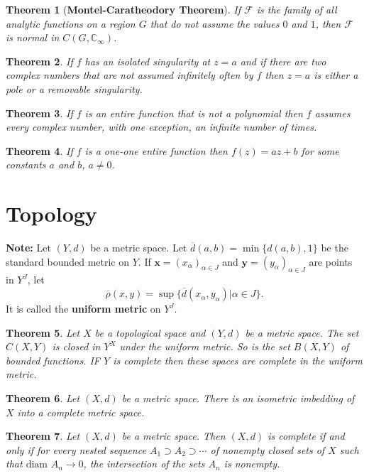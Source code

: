 \documentclass[answers, a4paper, 12pt]{exam}
\newtheorem{theorem}{Theorem}[section]
\newcommand{\C}{\mathbb{C}}
\begin{document}
\begin{theorem}[\textbf{Montel-Caratheodory Theorem}]
    If $\mathcal{F}$ is the family of all analytic functions on a region $G$ that do not assume the values $0$ and $1$, then $\mathcal{F}$ is normal in $C(G,\C_{\infty})$.
\end{theorem}

\begin{theorem}
    If $f$ has an isolated singularity at $z=a$ and if there are two complex numbers that are not assumed infinitely often by $f$ then $z=a$ is either a pole or a removable singularity.
\end{theorem}

\begin{theorem}
    If $f$ is an entire function that is not a polynomial then $f$ assumes every complex number, with one exception, an infinite number of times.
\end{theorem}

\begin{theorem}
    If $f$ is a one-one entire function then $f(z)=az+b$ for some constants $a$ and $b$, $a\neq 0$.
\end{theorem}

\newpage
\section{Topology}

\textbf{Note: }\justifying Let $(Y,d)$ be a metric space. Let $\overline{d}(a,b)=\min\{d(a,b), 1\}$ be the standard bounded metric on $Y$. If $\mathbf{x}=(x_\alpha)_{\alpha\in J}$ and $\mathbf{y}=(y_\alpha)_{\alpha\in J}$ are points in $Y^J$, let
$$\overline{\rho}(x,y)=\sup\{\overline{d}(x_\alpha,y_\alpha) | \alpha\in J\}.$$
It is called the \textbf{uniform metric} on $Y^J$.

\begin{theorem}
    Let $X$ be a topological space and $(Y,d)$ be a metric space. The set $C(X,Y)$ is closed in $Y^X$ under the uniform metric. So is the set $B(X,Y)$ of bounded functions. IF $Y$ is complete then these spaces are complete in the uniform metric.
\end{theorem}

\begin{theorem}
    Let $(X,d)$ be a metric space. There is an isometric imbedding of $X$ into a complete metric space.
\end{theorem}

\begin{theorem}
    Let $(X,d)$ be a metric space. Then $(X,d)$ is complete if and only if for every nested sequence $A_1\supset A_2 \supset\cdots$ of nonempty closed sets of $X$ such that $\text{diam }{A_n}\to 0$, the intersection of the sets $A_n$ is nonempty.
\end{theorem}
\end{document}
